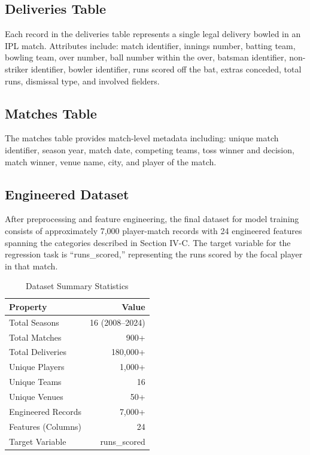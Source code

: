 \documentclass[conference]{IEEEtran}
\begin{document}
\subsection{Deliveries Table}
Each record in the deliveries table represents a single legal delivery bowled in an IPL match. Attributes include: match identifier, innings number, batting team, bowling team, over number, ball number within the over, batsman identifier, non-striker identifier, bowler identifier, runs scored off the bat, extras conceded, total runs, dismissal type, and involved fielders.

\subsection{Matches Table}
The matches table provides match-level metadata including: unique match identifier, season year, match date, competing teams, toss winner and decision, match winner, venue name, city, and player of the match.

\subsection{Engineered Dataset}
After preprocessing and feature engineering, the final dataset for model training consists of approximately 7,000 player-match records with 24 engineered features spanning the categories described in Section IV-C. The target variable for the regression task is ``runs\_scored,'' representing the runs scored by the focal player in that match.

\begin{table}[htbp]
\centering
\caption{Dataset Summary Statistics}
\label{tab:dataset}
\begin{tabular}{lr}
\toprule
\textbf{Property} & \textbf{Value} \\
\midrule
Total Seasons & 16 (2008–2024) \\
Total Matches & 900+ \\
Total Deliveries & 180,000+ \\
Unique Players & 1,000+ \\
Unique Teams & 16 \\
Unique Venues & 50+ \\
Engineered Records & 7,000+ \\
Features (Columns) & 24 \\
Target Variable & runs\_scored \\
\bottomrule
\end{tabular}
\end{table}
\end{document}
